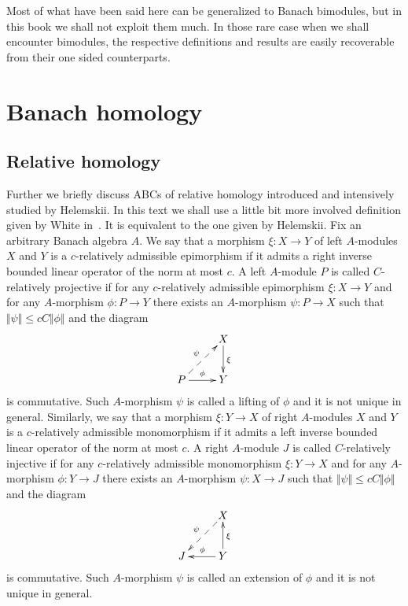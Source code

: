 Most of what have been said here can be generalized to Banach bimodules, but in
this book we shall not exploit them much. In those rare case when we shall
encounter bimodules, the respective definitions and results are easily
recoverable from their one sided counterparts.


\section{
  Banach homology
}\label{SectionBanachHomology}


\subsection{
  Relative homology
}\label{SubSectionRelativeHomology}

Further we briefly discuss ABCs of relative homology introduced and intensively
studied by Helemskii. In this text we shall use a little bit more involved
definition given by White in~\cite{WhiteInjmoduAlg}. It is equivalent to the one
given by Helemskii. Fix an arbitrary Banach algebra $A$. We say that a
morphism $\xi:X\to Y$ of left $A$-modules $X$ and $Y$ is a $c$-relatively 
admissible epimorphism if it admits a right inverse bounded linear operator of 
the norm at most $c$. A left $A$-module $P$ is called $C$-relatively projective 
if for any $c$-relatively admissible epimorphism $\xi:X\to Y$ and 
for any  $A$-morphism $\phi:P\to Y$ there exists 
an $A$-morphism $\psi:P\to X$ such 
that $\Vert \psi\Vert\leq cC\Vert \phi\Vert$ and the diagram
$$
\xymatrix{
& {X} \ar[d]^{\xi}\\  %
{P} \ar@{-->}[ur]^{\psi} \ar[r]^{\phi} &{Y}}  %
$$
is commutative. Such $A$-morphism $\psi$ is called a lifting of $\phi$ and it is
not unique in general. Similarly,  we say that a morphism $\xi:Y\to X$ of right
$A$-modules $X$ and $Y$ is a $c$-relatively admissible monomorphism if it admits
a left inverse bounded linear operator of the norm at most $c$. A right 
$A$-module $J$ is called $C$-relatively injective if for any $c$-relatively 
admissible monomorphism $\xi:Y\to X$ and for 
any $A$-morphism $\phi:Y\to J$ there exists an $A$-morphism $\psi:X\to J$ such 
that $\Vert\psi\Vert\leq cC\Vert\phi\Vert$ and the diagram
$$
\xymatrix{
& {X} \ar@{-->}[dl]_{\psi} \\  %
{J} &{Y} \ar[l]_{\phi} \ar[u]_{\xi}}  %
$$
is commutative. Such $A$-morphism $\psi$ is called an extension of $\phi$ and it
is not unique in general.

